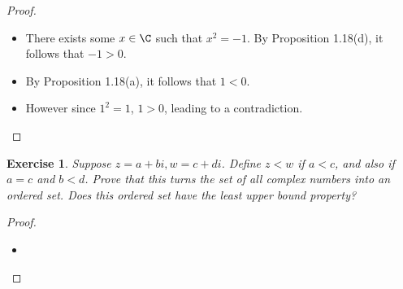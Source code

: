 \documentclass[12pt]{article}
\newtheorem{exercise}{Exercise}[section]
\begin{document}
\begin{proof}
    
    \begin{itemize}
        \item There exists some $x \in \C$ such that $x^2 = -1$. By Proposition 1.18(d), it follows that $-1 > 0$.
        \item By Proposition 1.18(a), it follows that $1 < 0$.
        \item However since $1^2 = 1$, $1 > 0$, leading to a contradiction.
    \end{itemize}
    
\end{proof}

\begin{exercise}
    Suppose $z = a+bi, w=c+di$. Define $z < w$ if $a<c$, and also if $a=c$ and $b< d$. Prove that this turns the set of all complex numbers into an ordered set. Does this ordered set have the least upper bound property?
\end{exercise}

\begin{proof}
    
    \begin{itemize}
        \item 
    \end{itemize}
    
\end{proof}
\end{document}
